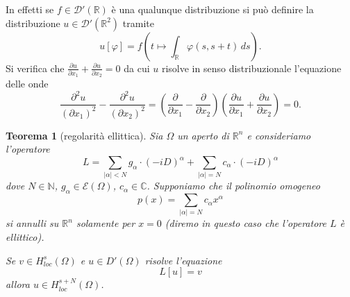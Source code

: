 \documentclass[italian,a4paper,oneside,headinclude]{scrbook}
\renewcommand{\phi}{\varphi}
\newcommand{\loc}{\mathit{loc}}
\newcommand{\D}{\mathcal D}
\newcommand{\E}{\mathcal E}
\newcommand{\CC}{\mathbb C}
\newcommand{\NN}{\mathbb N}
\newcommand{\RR}{\mathbb R}
\newcommand{\abs}[1]{{\left|#1\right|}}
\newtheorem{theorem}{Teorema}
\begin{document}
  In effetti se $f\in \D'(\RR)$ è una qualunque distribuzione si può
  definire la distribuzione $u\in \D'(\RR^2)$ tramite
  \[
  u[\phi] = f\left(t\mapsto \int_\RR \phi(s,s+t)\, ds\right).
  \]
  Si verifica che
  $\frac{\partial u}{\partial x_1}+\frac{\partial u}{\partial x_2} = 0$
  da cui $u$ risolve in senso distribuzionale l'equazione delle
  onde
  \[
  \frac{\partial^2 u}{(\partial x_1)^2} - \frac{\partial^2
    u}{(\partial x_2)^2}
  = \left(\frac{\partial}{\partial x_1}- \frac{\partial}{\partial
    x_2}\right)
   \left(\frac{\partial u}{\partial x_1}+\frac{\partial u}{\partial
     x_2}\right)  =0.
  \]

  \begin{theorem}[regolarità ellittica]
    Sia $\Omega$ un aperto di $\RR^n$
    e consideriamo l'operatore
    \[
    L = \sum_{\abs{\alpha}<N} g_\alpha\cdot  (-iD)^\alpha
    + \sum_{\abs{\alpha}=N} c_\alpha \cdot (-iD)^\alpha
    \]
    dove $N\in\NN$, $g_\alpha\in \E(\Omega)$, $c_\alpha \in \CC$.
    Supponiamo che il polinomio omogeneo
    \[
    p(x) = \sum_{\abs{\alpha}=N} c_\alpha x^\alpha
    \]
    si annulli su $\RR^n$ solamente per $x=0$
    (diremo in questo caso che l'operatore $L$ è \emph{ellittico}).

    Se $v \in H^s_\loc(\Omega)$ e $u\in D'(\Omega)$ risolve l'equazione
    \[
    L [u] = v
    \]
    allora $u\in H^{s+N}_\loc(\Omega)$.
  \end{theorem}
\end{document}
